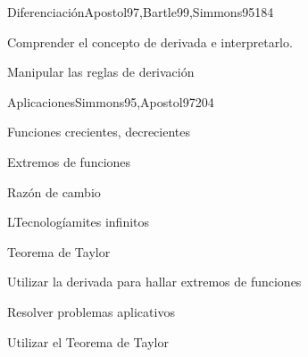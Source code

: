 \begin{syllabus}
\begin{unit}{Diferenciación}{Apostol97,Bartle99,Simmons95}{18}{4}
   \begin{unitgoals}
      \item Comprender el concepto de derivada e interpretarlo.
      \item Manipular las reglas de derivación
      \end{unitgoals}
\end{unit}

\begin{unit}{Aplicaciones}{Simmons95,Apostol97}{20}{4}
   \begin{topics}
      \item Funciones crecientes, decrecientes
      \item Extremos de funciones
      \item Razón de cambio
      \item LTecnologíamites infinitos
      \item Teorema de Taylor
   \end{topics}

   \begin{unitgoals}
      \item Utilizar la derivada para hallar extremos de funciones
      \item Resolver problemas aplicativos
      \item Utilizar el Teorema de Taylor
      \end{unitgoals}
\end{unit}



\begin{coursebibliography}
\end{coursebibliography}

\end{syllabus}
